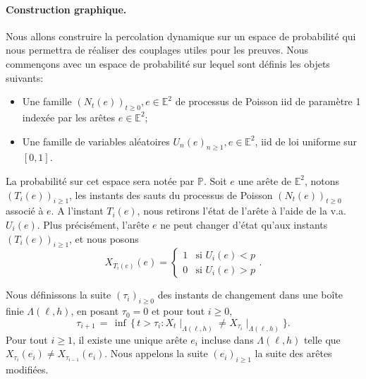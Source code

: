 \documentclass[titlepage,a4paper,12pt]{article}
\begin{document}
\paragraph{Construction graphique.} Nous allons construire la percolation dynamique sur un espace de probabilité qui nous permettra de réaliser des couplages utiles pour les preuves. Nous commençons avec un espace de probabilité sur lequel sont définis les objets suivants:

\begin{itemize}[label = $\bullet$, leftmargin = *]
\item Une famille $(N_t(e))_{t\geqslant 0},e\in\mathbb{E}^2$ de processus de Poisson iid de paramètre 1 indexée par les arêtes $e \in \mathbb{E}^2$;
\item Une famille de variables aléatoires $U_n(e)_{n\geqslant 1}, e\in \mathbb{E}^2$, iid de loi uniforme sur $[0,1]$.
\end{itemize} 

La probabilité sur cet espace sera notée par $\mathbb{P}$.
Soit $e$ une arête de $\mathbb{E}^2$, notons $(T_i(e))_{i\geqslant 1}$, les instants des sauts du processus de Poisson $(N_t(e))_{t\geqslant 0}$ associé à $e$. A l'instant $T_i(e)$, nous retirons l'état de l'arête à l'aide de la v.a. $U_i(e)$.
Plus précisément, l'arête $e$ ne peut changer d'état qu'aux instants $(T_i(e))_{i\geqslant 1}$, et nous posons 
$$ X_{T_i(e)}(e) = \left\lbrace \begin{array}{cc}
1 & \text{si }U_i(e) < p \\
0 & \text{si }U_i(e) > p
\end{array}
\right..
$$

Nous définissons la suite $(\tau_i)_{i\geqslant 0}$ des instants de changement dans une boîte finie $\Lambda(\ell,h)$, en posant $\tau_0 = 0$ et pour tout $i\geqslant 0$,
$$\tau_{i+1} \,=\, \inf \,\big\{ \, t>\tau_i: {X_t}\mid_{ \Lambda(\ell,h)} \neq {X_{\tau_i}}\mid_{ \Lambda(\ell,h)} \big \}.
$$
Pour tout $i\geqslant 1$, il existe une unique arête $e_i$ incluse dans $\Lambda(\ell,h)$ telle que $X_{\tau_i}(e_i) \neq X_{\tau_{i-1}}(e_i)$. Nous appelons la suite $(e_i)_{i\geqslant 1}$ la suite des arêtes modifiées.
\end{document}
